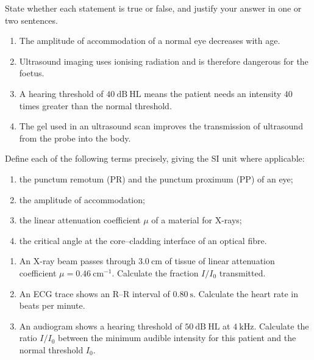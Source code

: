 \documentclass[11pt]{article}
\newcommand{\cle}[1]{{\popxbold\color{popdark}#1}}
\begin{document}
\begin{exercice}
State whether each statement is true or false, and justify your answer in one or two sentences.
\begin{enumerate}
\item The amplitude of accommodation of a normal eye decreases with age.
\item Ultrasound imaging uses ionising radiation and is therefore dangerous for the foetus.
\item A hearing threshold of $40\ \mathrm{dB\ HL}$ means the patient needs an intensity $40$ times greater than the normal threshold.
\item The gel used in an ultrasound scan improves the transmission of ultrasound from the probe into the body.
\end{enumerate}
\end{exercice}

\begin{exercice}[Definitions]
Define each of the following terms precisely, giving the SI unit where applicable:
\begin{enumerate}
\item the \cle{punctum remotum} (PR) and the \cle{punctum proximum} (PP) of an eye;
\item the \cle{amplitude of accommodation};
\item the \cle{linear attenuation coefficient} $\mu$ of a material for X-rays;
\item the \cle{critical angle} at the core--cladding interface of an optical fibre.
\end{enumerate}
\end{exercice}

\begin{exercice}
\begin{enumerate}
\item An X-ray beam passes through $3.0\ \mathrm{cm}$ of tissue of linear attenuation coefficient $\mu = 0.46\ \mathrm{cm^{-1}}$. Calculate the fraction $I/I_0$ transmitted.
\item An ECG trace shows an R--R interval of $0.80\ \mathrm{s}$. Calculate the heart rate in beats per minute.
\item An audiogram shows a hearing threshold of $50\ \mathrm{dB\ HL}$ at $4\ \mathrm{kHz}$. Calculate the ratio $I/I_0$ between the minimum audible intensity for this patient and the normal threshold $I_0$.
\end{enumerate}
\end{exercice}
\end{document}
